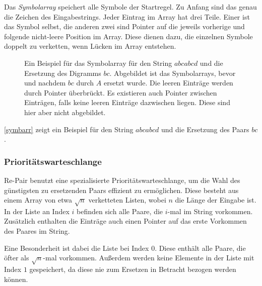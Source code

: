 Das \emph{Symbolarray} speichert alle Symbole der Startregel. Zu Anfang sind das genau die Zeichen des Eingabestrings. Jeder Eintrag im Array hat drei Teile. Einer ist das Symbol selbst, die anderen zwei sind Pointer auf die jeweils vorherige und folgende nicht-leere Position im Array. Diese dienen dazu, die einzelnen Symbole doppelt zu verketten, wenn Lücken im Array entstehen.
\begin{figure}
	\centering
	\caption{Ein Beispiel für das Symbolarray für den String $abcabcd$ und die Ersetzung des Digramms $bc$. Abgebildet ist das Symbolarrays, bevor und nachdem $bc$ durch $A$ ersetzt wurde. Die leeren Einträge werden durch Pointer überbrückt. Es existieren auch Pointer zwischen Einträgen, falls keine leeren Einträge dazwischen liegen. Diese sind hier aber nicht abgebildet.}
    \label{symbarr}
\end{figure}
\autoref{symbarr} zeigt ein Beispiel für den String $abcabcd$ und die Ersetzung des Paars $bc$.

\subsubsection{Prioritätswarteschlange}

Re-Pair benutzt eine spezialisierte Prioritätswarteschlange, um die Wahl des günstigsten zu ersetzenden Paars effizient zu ermöglichen. Diese besteht aus einem Array von etwa $\sqrt{n}$ verketteten Listen, wobei $n$ die Länge der Eingabe ist. In der Liste an Index $i$ befinden sich alle Paare, die $i$-mal im String vorkommen. Zusätzlich enthalten die Einträge auch  einen Pointer auf das erste Vorkommen des Paares im String.

Eine Besonderheit ist dabei die Liste bei Index $0$. Diese enthält alle Paare, die öfter als $\sqrt{n}$-mal vorkommen. Außerdem werden keine Elemente in der Liste mit Index $1$ gespeichert, da diese nie zum Ersetzen in Betracht bezogen werden können.
 
